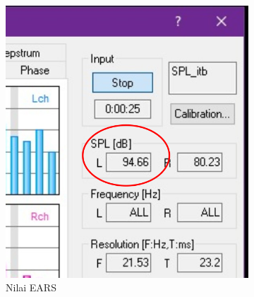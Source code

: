 \documentclass[12pt]{book}
\begin{document}
	\begin{figure}[!ht]
		\centering
		\begin{subfigure}[t]{0.4\textwidth}
			\includegraphics[width=\textwidth]{images/hasil/spl_rta}
			\caption{Nilai EARS}
		\end{subfigure}
		\begin{subfigure}[t]{0.4\textwidth}

\end{subfigure}
\end{figure}
\end{document}
